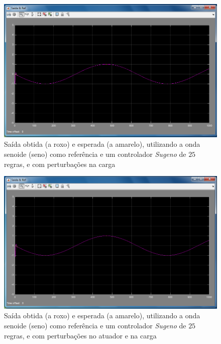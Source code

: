 \documentclass{article}
\begin{document}
\begin{figure}[h]
  \centering
      \includegraphics[scale=0.3]{Images/Sugeno_25_sin_charge.png}
  \caption{Saída obtida (a roxo) e esperada (a amarelo), utilizando a onda senoide (seno) como referência e um controlador \emph{Sugeno} de $25$ regras, e com perturbações na carga}
\end{figure}

\begin{figure}[h]
  \centering
      \includegraphics[scale=0.3]{Images/Sugeno_25_sin_actuator_charge.png}
  \caption{Saída obtida (a roxo) e esperada (a amarelo), utilizando a onda senoide (seno) como referência e um controlador \emph{Sugeno} de $25$ regras, e com perturbações no atuador e na carga}
\end{figure}
\end{document}
